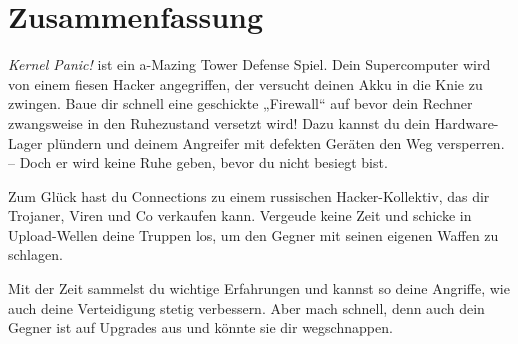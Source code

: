 \section{Zusammenfassung}


\textit{Kernel Panic!} ist ein a-Mazing Tower Defense Spiel.
Dein Supercomputer wird von einem fiesen Hacker angegriffen, der versucht deinen Akku in die Knie zu zwingen.
Baue dir schnell eine geschickte „Firewall“ auf bevor dein Rechner zwangsweise in den Ruhezustand versetzt wird! Dazu kannst du dein Hardware-Lager plündern und deinem Angreifer mit defekten Geräten den Weg versperren. -- Doch er wird keine Ruhe geben, bevor du nicht besiegt bist.

Zum Glück hast du Connections zu einem russischen Hacker-Kollektiv, das dir Trojaner, Viren und Co verkaufen kann. Vergeude keine Zeit und schicke in Upload-Wellen deine Truppen los, um den Gegner mit seinen eigenen Waffen zu schlagen.

Mit der Zeit sammelst du wichtige Erfahrungen und kannst so deine Angriffe, wie auch deine Verteidigung stetig verbessern. Aber mach schnell, denn auch dein Gegner ist auf Upgrades aus und könnte sie dir wegschnappen.

